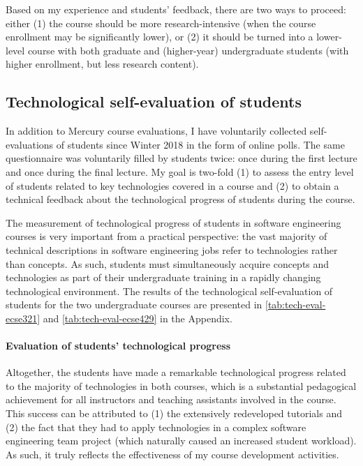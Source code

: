 Based on my experience and students' feedback, there are two ways to proceed: either (1) the course should be more research-intensive (when the course enrollment may be significantly lower), or (2) it should be turned into a lower-level course with both graduate and (higher-year) undergraduate students (with higher enrollment, but less research content). 




\subsection{Technological self-evaluation of students}
In addition to Mercury course evaluations, I have voluntarily collected self-evaluations of students since Winter 2018 in the form of online polls. The same questionnaire was voluntarily filled by students twice: once during the first lecture and once during the final lecture. My goal is two-fold (1) to assess the entry level of students related to key technologies covered in a course and (2) to obtain a technical feedback about the technological progress of students during the course. 

The measurement of technological progress of students in software engineering courses is very important from a practical perspective: the vast majority of technical descriptions in software engineering jobs refer to technologies rather than concepts. As such, students must simultaneously acquire concepts and technologies as part of their undergraduate training in a rapidly changing technological environment. 
The results of the technological self-evaluation of students for the two undergraduate courses are presented in \autoref{tab:tech-eval-ecse321} and \autoref{tab:tech-eval-ecse429} in the Appendix.

\paragraph{Evaluation of students' technological progress}

Altogether, the students have made a remarkable technological progress related to the majority of technologies in both 
courses, which is a substantial pedagogical achievement for all instructors and teaching assistants involved in the course. 
This success can be attributed to (1) the extensively redeveloped tutorials and (2) the fact that they had to apply 
technologies in a complex software engineering team project (which naturally caused an increased student workload).  As 
such, it truly reflects the effectiveness of my course development activities. 

